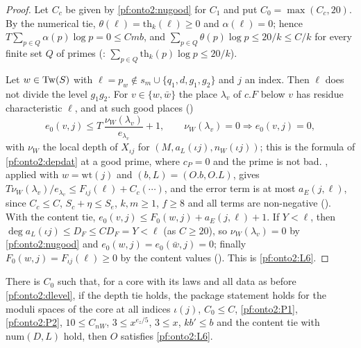 \begin{proof}
Let $C_c$ be given by \cref{pf:onto2:nugood} for $C_1$ and put $C_0=\max(C_c,20)$. By the numerical tie, $\theta(\ell)=\mathrm{th}_k(\ell)\ge0$
and $\alpha(\ell)=0$; hence $T\sum_{p\in Q}\alpha(p)\log p=0\le Cmb$, and
$\sum_{p\in Q}\theta(p)\log p\le20/k\le C/k$ for every finite set $Q$ of primes
(: $\sum_{p\in Q}\mathrm{th}_k(p)\log p\le20/k$).

Let $w\in\mathrm{Tw}(S)$ with $\ell=p_w\notin s_m\cup\{q_1,d,g_1,g_2\}$ and $j$ an index. Then $\ell$ does not divide the level $g_1g_2$. For
$v\in\{w,\bar w\}$ the place $\lambda_v$ of $c.F$ below $v$ has residue characteristic $\ell$, and at such good places
()
\[
e_0(v,j)\le T\,\frac{\nu_W(\lambda_v)}{e_{\lambda_v}}+1,\qquad \nu_W(\lambda_v)=0\Rightarrow e_0(v,j)=0,
\]
with $\nu_W$ the local depth of $X_{\iota j}$ for $(M,a_L(\iota j),n_W(\iota j))$; this is the formula of \cref{pf:onto2:depdat} at a
good prime, where $c_P=0$ and the prime is not bad. , applied with $w=\mathrm{wt}(j)$ and $(b,L)=(O.b,O.L)$, gives
$T\nu_W(\lambda_v)/e_{\lambda_v}\le F_{\iota j}(\ell)+C_c(\cdots)$, and the error term is at most $a_E(j,\ell)$, since $C_c\le C$, $S_c+\eta\le S_e$,
$k,m\ge1$, $f\ge8$ and all terms are non-negative (). With the content tie,
$e_0(v,j)\le F_0(w,j)+a_E(j,\ell)+1$. If $Y<\ell$, then $\deg a_L(\iota j)\le D_F\le CD_F=Y<\ell$ (as $C\ge20$), so
$\nu_W(\lambda_v)=0$ by \cref{pf:onto2:nugood} and $e_0(w,j)=e_0(\bar w,j)=0$; finally $F_0(w,j)=F_{\iota j}(\ell)\ge0$ by the content values
(). This is \ref{pf:onto2:L6}.
\end{proof}

\begin{proposition}\label{pf:onto2:leafgoodrun}
There is $C_0$ such that, for a core with its laws and all data as before \cref{pf:onto2:dlevel}, if the depth tie holds, the package
statement holds for the moduli spaces of the core at all indices $\iota(j)$, $C_0\le C$, \ref{pf:onto2:P1}, \ref{pf:onto2:P2},
$10\le C_{nW}$, $3\le x^{e_z/5}$, $3\le x$, $kb'\le b$ and the content tie with $\mathrm{num}(D,L)$ hold, then $O$ satisfies
\ref{pf:onto2:L6}.
\end{proposition}

